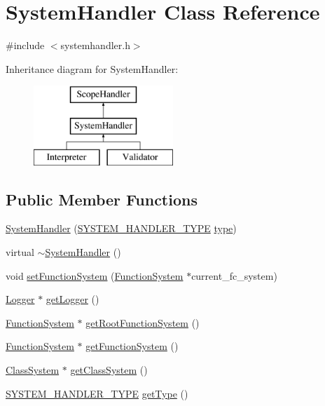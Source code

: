 \hypertarget{classSystemHandler}{}\section{System\+Handler Class Reference}
\label{classSystemHandler}


{\ttfamily \#include $<$systemhandler.\+h$>$}

Inheritance diagram for System\+Handler\+:\begin{figure}[H]
\begin{center}
\leavevmode
\includegraphics[height=3.000000cm]{classSystemHandler}
\end{center}
\end{figure}
\subsection*{Public Member Functions}
\begin{DoxyCompactItemize}
\item 
\hyperlink{classSystemHandler_ae137763b37da96d62288adddba15aae7}{System\+Handler} (\hyperlink{statics_8h_a28f867553077bc713fdf8921a9226e2e}{S\+Y\+S\+T\+E\+M\+\_\+\+H\+A\+N\+D\+L\+E\+R\+\_\+\+T\+Y\+PE} \hyperlink{classSystemHandler_a8ca6090af683e8555051681fd31cd865}{type})
\item 
virtual \hyperlink{classSystemHandler_afd4662824fbf97d8feb248c346968102}{$\sim$\+System\+Handler} ()
\item 
void \hyperlink{classSystemHandler_af27b9410a75ac02dff13b045afdff038}{set\+Function\+System} (\hyperlink{classFunctionSystem}{Function\+System} $\ast$current\+\_\+fc\+\_\+system)
\item 
\hyperlink{classLogger}{Logger} $\ast$ \hyperlink{classSystemHandler_a2d30e2dd0efb6287ae14b36f1c6bb48b}{get\+Logger} ()
\item 
\hyperlink{classFunctionSystem}{Function\+System} $\ast$ \hyperlink{classSystemHandler_acecab58c51aa620942f4364f5a42a21c}{get\+Root\+Function\+System} ()
\item 
\hyperlink{classFunctionSystem}{Function\+System} $\ast$ \hyperlink{classSystemHandler_a052dfd8bfff27ed9bf12fd84e066ecb3}{get\+Function\+System} ()
\item 
\hyperlink{classClassSystem}{Class\+System} $\ast$ \hyperlink{classSystemHandler_a218066abe52952bf45c3ba21fdf86368}{get\+Class\+System} ()
\item 
\hyperlink{statics_8h_a28f867553077bc713fdf8921a9226e2e}{S\+Y\+S\+T\+E\+M\+\_\+\+H\+A\+N\+D\+L\+E\+R\+\_\+\+T\+Y\+PE} \hyperlink{classSystemHandler_a7d5df891633958f20c66e8046019bdcb}{get\+Type} ()
\end{DoxyCompactItemize}
